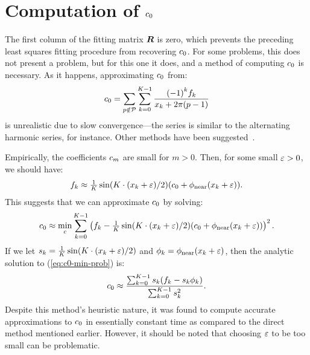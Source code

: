 \section{Computation of ${c}_{0}$}

The first column of the fitting matrix $\boldsymbol{R}$ is zero, which prevents
the preceding least squares fitting procedure from recovering
${c}_{0}$. For some problems, this does not present a problem,
but for this one it does, and a method of computing ${c}_{0}$
is necessary. As it happens, approximating ${c}_{0}$ from:
\begin{align}
  \label{eq:c0-direct}
  {c}_{0} = \sum_{p\notin\mathcal{P}}\sum_{k=0}^{K-1} \frac{{(-1)}^k {f}_{k}}{{x}_{k} + 2\pi(p - 1)}
\end{align}
is unrealistic due to slow convergence---the series is similar to the
alternating harmonic series, for instance. Other methods have been
suggested~\cite{periodic-sums}.

Empirically, the coefficients ${c}_{m}$ are small for $m >
0$. Then, for some small $\varepsilon > 0$, we should have:
\begin{align}
  \label{eq:g-approx-for-c0}
  {f}_{k} \approx \tfrac{1}{K} \sin(K{} \cdot ({x}_{k} + \varepsilon)/2) ({c}_{0} + \phi_{\operatorname{near}}({x}_{k} + \varepsilon)).
\end{align}
This suggests that we can approximate ${c}_{0}$ by solving:
\begin{align}
  \label{eq:c0-min-prob}
  {c}_{0} \approx \min_c \sum_{k=0}^{K-1} \left({f}_{k} - \tfrac{1}{K} \sin(K{} \cdot ({x}_{k} + \varepsilon)/2) ({c}_{0} + \phi_{\operatorname{near}}({x}_{k} + \varepsilon))\right)^2.
\end{align}
If we let
$s_k = \tfrac{1}{K{}} \sin(K{} \cdot
({x}_{k} + \varepsilon)/2)$ and
$\phi_k = \phi_{\operatorname{near}}({x}_{k} + \varepsilon)$, then the
analytic solution to (\ref{eq:c0-min-prob}) is:
\begin{align}
  \label{eq:c0-minimizer}
  {c}_{0} \approx \frac{\sum_{k=0}^{K-1} s_k({f}_{k} - s_k\phi_k)}{\sum_{k=0}^{K-1} s_k^2}.
\end{align}
Despite this method's heuristic nature, it was found to compute
accurate approximations to ${c}_{0}$ in essentially constant
time as compared to the direct method mentioned earlier. However, it
should be noted that choosing $\varepsilon$ to be too small can be
problematic.


